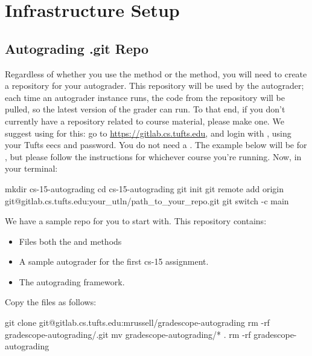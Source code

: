 \documentclass[11pt]{report}
\begin{document}
\chapter*{Infrastructure Setup}
\section*{Autograding .git Repo}
Regardless of whether you use the  method or the  method, you will need to
create a  repository for your autograder. This repository will be used by the autograder; 
each time an autograder instance runs, the code from the repository will be pulled, so the latest version
of the grader can run. To that end, if you don't currently have a repository related to course material, please make one. 
We suggest using  for this: go to \textcolor{blue}{\href{https://gitlab.cs.tufts.edu}{https://gitlab.cs.tufts.edu}}, and 
login with , using your Tufts eecs  and password. You do not need a .
The example below will be for , but please follow the instructions for whichever course you're running.
Now, in your terminal:
\begin{bashcodeblock}
mkdir cs-15-autograding
cd cs-15-autograding
git init
git remote add origin git@gitlab.cs.tufts.edu:your_utln/path_to_your_repo.git
git switch -c main 
\end{bashcodeblock}
We have a sample repo for you to start with. This repository contains:
\begin{itemize}
      \item Files both the  and  methods 
      \item A sample autograder for the first cs-15 assignment. 
      \item The autograding framework.
\end{itemize}
Copy the files as follows:
\begin{bashcodeblock}
git clone git@gitlab.cs.tufts.edu:mrussell/gradescope-autograding
rm -rf gradescope-autograding/.git
mv gradescope-autograding/* .
rm -rf gradescope-autograding
\end{bashcodeblock}
\end{document}
